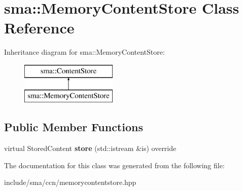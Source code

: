 \hypertarget{classsma_1_1MemoryContentStore}{\section{sma\-:\-:Memory\-Content\-Store Class Reference}
\label{classsma_1_1MemoryContentStore}
}
Inheritance diagram for sma\-:\-:Memory\-Content\-Store\-:\begin{figure}[H]
\begin{center}
\leavevmode
\includegraphics[height=2.000000cm]{classsma_1_1MemoryContentStore}
\end{center}
\end{figure}
\subsection*{Public Member Functions}
\begin{DoxyCompactItemize}
\item 
\hypertarget{classsma_1_1MemoryContentStore_ab8a9ffda41174ce2fda193dd91797d9f}{virtual Stored\-Content {\bfseries store} (std\-::istream \&is) override}\label{classsma_1_1MemoryContentStore_ab8a9ffda41174ce2fda193dd91797d9f}

\end{DoxyCompactItemize}


The documentation for this class was generated from the following file\-:\begin{DoxyCompactItemize}
\item 
include/sma/ccn/memorycontentstore.\-hpp\end{DoxyCompactItemize}
